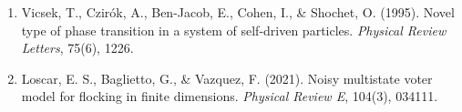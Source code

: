 \documentclass[11pt,a4paper]{article}
\begin{document}
\begin{enumerate}
\item[{[1]}] Vicsek, T., Czirók, A., Ben-Jacob, E., Cohen, I., \& Shochet, O. (1995). Novel type of phase transition in a system of self-driven particles. \textit{Physical Review Letters}, 75(6), 1226.
\item[{[2]}] Loscar, E. S., Baglietto, G., \& Vazquez, F. (2021). Noisy multistate voter model for flocking in finite dimensions. \textit{Physical Review E}, 104(3), 034111.
\end{enumerate}
\end{document}
